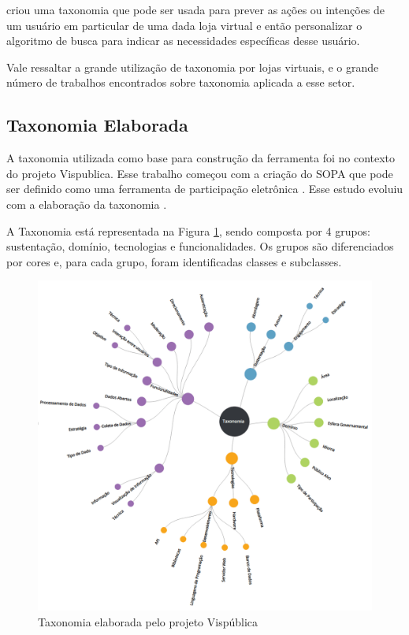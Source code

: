 \par
{} criou uma taxonomia que pode ser usada para prever as ações ou intenções de um usuário em particular de uma dada loja virtual
e então personalizar o algoritmo de busca para indicar as necessidades específicas desse usuário.

\par
Vale ressaltar a grande utilização de taxonomia por lojas virtuais, e o grande número de trabalhos encontrados sobre taxonomia aplicada a esse setor.

\subsection{Taxonomia Elaborada}
\label{subsec:taxonomiaElaborada}
\par
A taxonomia utilizada como base para construção da ferramenta foi no contexto do projeto Vispublica. Esse trabalho começou com a criação do SOPA que pode ser definido como uma ferramenta de participação eletrônica . Esse estudo evoluiu com a elaboração da taxonomia . 

\par
A Taxonomia está representada na Figura \ref{fig:taxonomia-vispublica}, sendo composta por 4 grupos: sustentação, domínio, tecnologias e funcionalidades.
Os grupos são diferenciados por cores e, para cada grupo, foram identificadas classes e subclasses.

\begin{figure}[!ht]
    \centering
    \includegraphics[scale=0.30]{./figuras/taxonopart-radial.png}
    \caption{Taxonomia elaborada pelo projeto Vispública}
    \label{fig:taxonomia-vispublica}
\end{figure}

